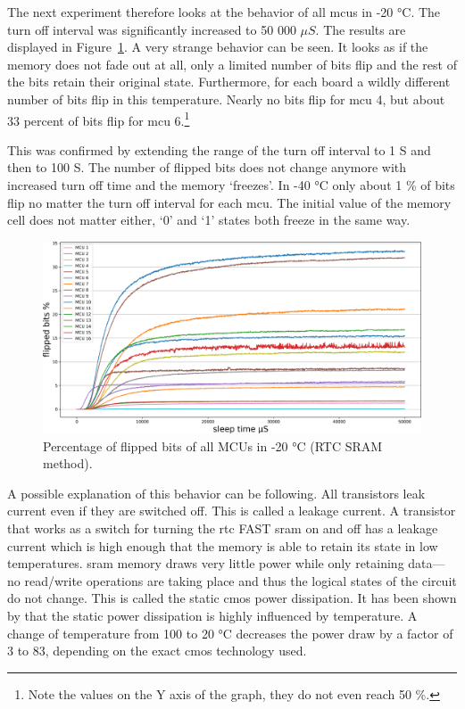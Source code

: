 The next experiment therefore looks at the behavior of all \glspl{mcu} in -20 °C. The turn off interval was significantly increased to 50 000 $\mu{}S$. The results are displayed in Figure~\ref{fig:all_minus_20_rtc}. A very strange behavior can be seen. It looks as if the memory does not fade out at all, only a limited number of bits flip and the rest of the bits retain their original state. Furthermore, for each board a wildly different number of bits flip in this temperature. Nearly no bits flip for \gls{mcu} 4, but about 33 percent of bits flip for \gls{mcu} 6.\footnote{Note the values on the Y axis of the graph, they do not even reach 50 \%.}

This was confirmed by extending the range of the turn off interval to 1 S and then to 100 S. The number of flipped bits does not change anymore with increased turn off time and the memory `freezes'. In -40 °C only about 1 \% of bits flip no matter the turn off interval for each \gls{mcu}. The initial value of the memory cell does not matter either, `0' and `1' states both freeze in the same way. 

\begin{figure}[ht!]
    \centering
    \captionsetup{justification=centering,margin=0.5cm}
    \includegraphics[width=\textwidth]{images/all_minus_20_rtc.png}
    \caption{Percentage of flipped bits of all MCUs in -20 °C (RTC SRAM method).}
    \label{fig:all_minus_20_rtc}
\end{figure}

A possible explanation of this behavior can be following. All transistors leak current even if they are switched off. This is called a leakage current. A transistor that works as a switch for turning the \gls{rtc} FAST \gls{sram} on and off has a leakage current which is high enough that the memory is able to retain its state in low temperatures. \gls{sram} memory draws very little power while only retaining data---no read/write operations are taking place and thus the logical states of the circuit do not change. This is called the static \gls{cmos} power dissipation. It has been shown by \cite{Kocanda2015} that the static power dissipation is highly influenced by temperature. A change of temperature from 100 to 20 °C decreases the power draw by a factor of 3 to 83, depending on the exact \gls{cmos} technology used.

